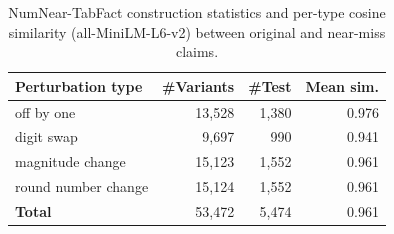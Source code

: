 \begin{table}[t]
\centering
\caption{NumNear-TabFact construction statistics and per-type cosine similarity (all-MiniLM-L6-v2) between original and near-miss claims.}
\label{tab:numnear-stats}
\begin{tabular}{lrrr}
\toprule
Perturbation type & \#Variants & \#Test & Mean sim.\\
\midrule
off by one & 13,528 & 1,380 & 0.976 \\
digit swap & 9,697 & 990 & 0.941 \\
magnitude change & 15,123 & 1,552 & 0.961 \\
round number change & 15,124 & 1,552 & 0.961 \\
\midrule
\textbf{Total} & 53,472 & 5,474 & 0.961 \\
\bottomrule
\end{tabular}
\end{table}
